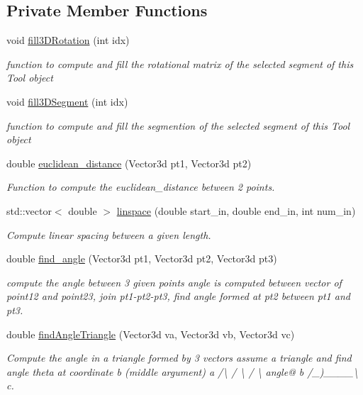 \subsection*{Private Member Functions}
\begin{DoxyCompactItemize}
\item 
void \hyperlink{classCreate__Tool_a271f74ac5f1fe45a0ee1069f42fbadaf}{fill3\+D\+Rotation} (int idx)
\begin{DoxyCompactList}\small\item\em function to compute and fill the rotational matrix of the selected segment of this \textquotesingle{}Tool\textquotesingle{} object \end{DoxyCompactList}\item 
void \hyperlink{classCreate__Tool_ae2fa728fd141b1eea18ab82cb67c58de}{fill3\+D\+Segment} (int idx)
\begin{DoxyCompactList}\small\item\em function to compute and fill the segmention of the selected segment of this \textquotesingle{}Tool\textquotesingle{} object \end{DoxyCompactList}\item 
double \hyperlink{classCreate__Tool_a7f49a49b557bdde922b2bb7e9c230c6f}{euclidean\+\_\+distance} (Vector3d pt1, Vector3d pt2)
\begin{DoxyCompactList}\small\item\em Function to compute the euclidean\+\_\+distance between 2 points. \end{DoxyCompactList}\item 
std\+::vector$<$ double $>$ \hyperlink{classCreate__Tool_a419350e8721927d095385aa6bef0bc4b}{linspace} (double start\+\_\+in, double end\+\_\+in, int num\+\_\+in)
\begin{DoxyCompactList}\small\item\em Compute linear spacing between a given length. \end{DoxyCompactList}\item 
double \hyperlink{classCreate__Tool_ad015a621844305c141ae1e405402e617}{find\+\_\+angle} (Vector3d pt1, Vector3d pt2, Vector3d pt3)
\begin{DoxyCompactList}\small\item\em compute the angle between 3 given points angle is computed between vector of point12 and point23, join pt1-\/pt2-\/pt3, find angle formed at pt2 between pt1 and pt3. \end{DoxyCompactList}\item 
double \hyperlink{classCreate__Tool_a4a9c9e0219a63df284ece42c198d9c73}{find\+Angle\+Triangle} (Vector3d va, Vector3d vb, Vector3d vc)
\begin{DoxyCompactList}\small\item\em Compute the angle in a triangle formed by 3 vectors assume a triangle and find angle theta at coordinate b (middle argument) a /\textbackslash{} / \textbackslash{} / \textbackslash{} angle@ b /\+\_\+)\+\_\+\+\_\+\+\_\+\+\_\+\textbackslash{} c. \end{DoxyCompactList}\end{DoxyCompactItemize}
